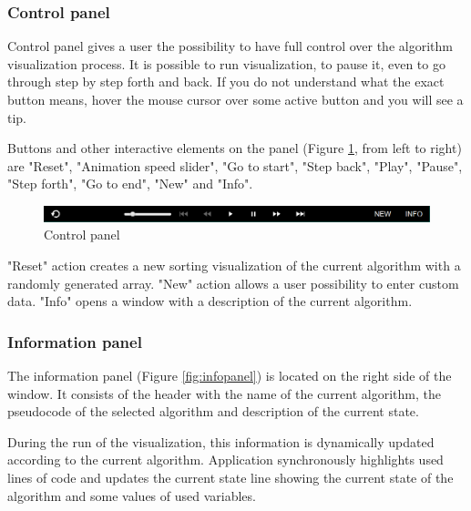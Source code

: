 \documentclass[
  field=inf,
  biblatex,
  language=english,
  glossaries,
  theorems=false,
  sourcecodes=false,
  index
]{kidiplom}
\begin{document}
\subsubsection{Control panel}

Control panel gives a user the possibility to have full control over the algorithm visualization process. It is possible to run visualization, to pause it, even to go through step by step forth and back. If you do not understand what the exact button means, hover the mouse cursor over some active button and you will see a tip.

Buttons and other interactive elements on the panel (Figure \ref{fig:controls}, from left to right) are "Reset", "Animation speed slider", "Go to start", "Step back", "Play", "Pause", "Step forth", "Go to end", "New" and "Info".

\begin{figure}[H]
\begin{center}
	\includegraphics[scale=0.5]{img/ui/Controls.png}
	\caption{Control panel}\label{fig:controls}
\end{center}
\end{figure}

"Reset" action creates a new sorting visualization of the current algorithm with a randomly generated array. "New" action allows a user possibility to enter custom data. "Info" opens a window with a description of the current algorithm.

\subsubsection{Information panel}

The information panel (Figure \ref{fig:infopanel}) is located on the right side of the window. It consists of the header with the name of the current algorithm, the pseudocode of the selected algorithm and description of the current state.

During the run of the visualization, this information is dynamically updated according to the current algorithm. Application synchronously highlights used lines of code and updates the current state line showing the current state of the algorithm and some values of used variables.
\end{document}
